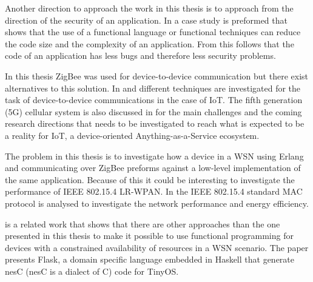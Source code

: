 Another direction to approach the work in this thesis is to approach from the direction of the security of an application. In \citet{haenisch2016case} a case study is preformed that shows that the use of a functional language or functional techniques can reduce the code size and the complexity of an application. From this follows that the code of an application has less bugs and therefore less security problems.

In this thesis ZigBee was used for device-to-device communication but there exist alternatives to this solution. In \citet{essameldindevice} and \citet{militano20155g} different techniques are investigated for the task of device-to-device communications in the case of IoT. The fifth generation (5G) cellular system is also discussed in \citet{militano20155g} for the main challenges and the coming research directions that needs to be investigated to reach what is expected to be a reality for IoT, a device-oriented Anything-as-a-Service ecosystem.

The problem in this thesis is to investigate how a device in a WSN using Erlang and communicating over ZigBee preforms against a low-level implementation of the same application. Because of this it could be interesting to investigate the performance of IEEE 802.15.4 LR-WPAN. In \citet{kohvakka2006performance} the IEEE 802.15.4 standard MAC protocol is analysed to investigate the network performance and energy efficiency.

\citet{mainland2008flask} is a related work that shows that there are other approaches than the one presented in this thesis to make it possible to use functional programming for devices with a constrained availability of resources in a WSN scenario. The paper presents Flask, a domain specific language embedded in Haskell that generate nesC (nesC is a dialect of C) code for TinyOS.
